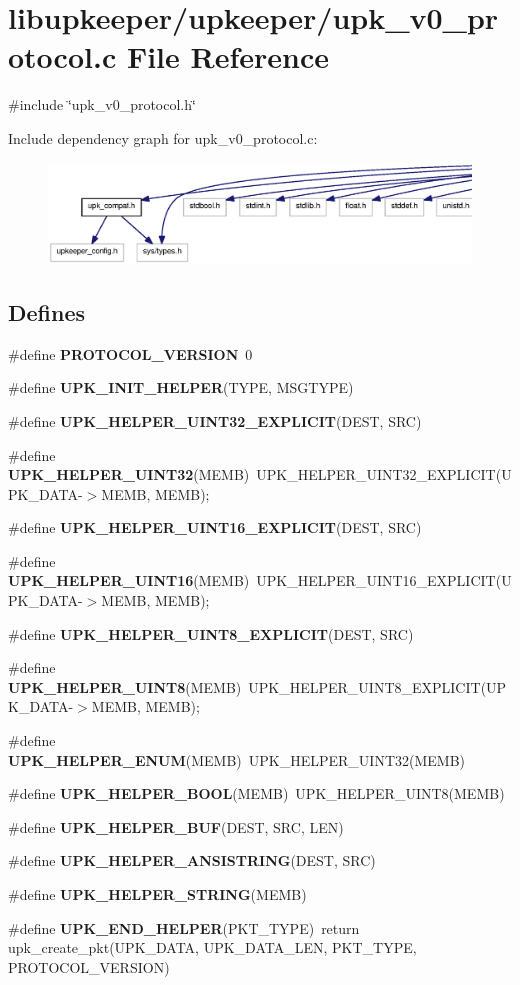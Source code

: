 \section{libupkeeper/upkeeper/upk\_\-v0\_\-protocol.c File Reference}
\label{upk__v0__protocol_8c}
{\ttfamily \#include \char`\"{}upk\_\-v0\_\-protocol.h\char`\"{}}\par
Include dependency graph for upk\_\-v0\_\-protocol.c:
\nopagebreak
\begin{figure}[H]
\begin{center}
\leavevmode
\includegraphics[width=400pt]{upk__v0__protocol_8c__incl}
\end{center}
\end{figure}
\subsection*{Defines}
\begin{DoxyCompactItemize}
\item 
\#define {\bf PROTOCOL\_\-VERSION}~0
\item 
\#define {\bf UPK\_\-INIT\_\-HELPER}(TYPE, MSGTYPE)
\item 
\#define {\bf UPK\_\-HELPER\_\-UINT32\_\-EXPLICIT}(DEST, SRC)
\item 
\#define {\bf UPK\_\-HELPER\_\-UINT32}(MEMB)~UPK\_\-HELPER\_\-UINT32\_\-EXPLICIT(UPK\_\-DATA-\/$>$MEMB, MEMB);
\item 
\#define {\bf UPK\_\-HELPER\_\-UINT16\_\-EXPLICIT}(DEST, SRC)
\item 
\#define {\bf UPK\_\-HELPER\_\-UINT16}(MEMB)~UPK\_\-HELPER\_\-UINT16\_\-EXPLICIT(UPK\_\-DATA-\/$>$MEMB, MEMB);
\item 
\#define {\bf UPK\_\-HELPER\_\-UINT8\_\-EXPLICIT}(DEST, SRC)
\item 
\#define {\bf UPK\_\-HELPER\_\-UINT8}(MEMB)~UPK\_\-HELPER\_\-UINT8\_\-EXPLICIT(UPK\_\-DATA-\/$>$MEMB, MEMB);
\item 
\#define {\bf UPK\_\-HELPER\_\-ENUM}(MEMB)~UPK\_\-HELPER\_\-UINT32(MEMB)
\item 
\#define {\bf UPK\_\-HELPER\_\-BOOL}(MEMB)~UPK\_\-HELPER\_\-UINT8(MEMB)
\item 
\#define {\bf UPK\_\-HELPER\_\-BUF}(DEST, SRC, LEN)
\item 
\#define {\bf UPK\_\-HELPER\_\-ANSISTRING}(DEST, SRC)
\item 
\#define {\bf UPK\_\-HELPER\_\-STRING}(MEMB)
\item 
\#define {\bf UPK\_\-END\_\-HELPER}(PKT\_\-TYPE)~return upk\_\-create\_\-pkt(UPK\_\-DATA, UPK\_\-DATA\_\-LEN, PKT\_\-TYPE, PROTOCOL\_\-VERSION)
\end{DoxyCompactItemize}
